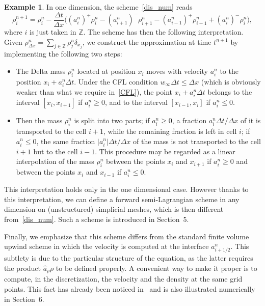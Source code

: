 \documentclass[11pt]{article}
\theoremstyle{definition}
\newtheorem{exam}[theo]{Example}
\numberwithin{equation}{section}
\newcommand*\ZZ{\mathbb{Z}}
\newcommand*\achapo{\widehat{a}}
\begin{document}
\begin{exam}\label{ex1D}
In one dimension, the scheme~\eqref{dis_num} reads
\[
\rho_{i}^{n+1} = \rho_i^n - \frac{\Delta t}{\Delta x}\Big((a_i^n)^+ \rho_i^n - (a_{i+1}^n)^- \rho_{i+1}^n - (a_{i-1}^n)^+ \rho_{i-1}^n + (a_i^n)^-\rho_i^n\Big),
\]
where $i$ is just taken in $\ZZ$. The scheme has then the following interpretation. Given $\rho^n_{\Delta x} = \sum_{j\in \ZZ} \rho_j^n \delta_{x_j}$, we construct the approximation at time $t^{n+1}$ by implementing the following two steps:
\begin{itemize}
\item The Delta mass $\rho_i^n$ located at position $x_i$ moves with velocity $a_i^n$ to the position $x_i+a_i^n \Delta t$. Under the CFL condition $w_\infty \Delta t \leq \Delta x$ (which is obviously weaker than what we require in~\eqref{CFL}), the point $x_i+a_i^n\Delta t$ belongs to the interval $[x_i,x_{i+1}]$ if $a_i^n\geq 0$, and to the interval $[x_{i-1},x_{i}]$ if $a_i^n\leq 0$.
\item Then the mass $\rho_{i}^n$ is split into two parts; if $a_{i}^n \geq 0$, a fraction $a_{i}^n \Delta t/\Delta x$ of it is transported to the cell $i+1$, while the remaining fraction is left in cell $i$; if $a_{i}^n \leq 0$, the same fraction $\vert a_{i}^n \vert \Delta t/\Delta x$ of the mass is not transported to the cell $i+1$ but to the cell $i-1$. This procedure may be regarded as a linear interpolation of the mass $\rho_{i}^n$ between the points $x_{i}$ and $x_{i+1}$ if $a_{i}^n \geq 0$ and between the points $x_{i}$ and $x_{i-1}$ if $a_{i}^n \leq 0$.
\end{itemize}
This interpretation holds only in the one dimensional case. However thanks to this interpretation, we can define a forward semi-Lagrangian scheme in any dimension on (unstructured) simplicial meshes, which is then different from~\eqref{dis_num}. Such a scheme is introduced in Section~5.

Finally, we emphasize that this scheme differs from the standard finite volume upwind scheme in which the velocity is computed at the interface $a_{i+1/2}^n$. This subtlety is due to the particular structure of the equation, as the latter requires the product $\achapo_{\rho} \rho$ to be defined properly. A convenient way to make it proper is to compute, in the discretization, the velocity and the density at the same grid points. This fact has already been noticed in~\cite{sinum,sisc} and is also illustrated numerically in Section~6.
\end{exam}
\end{document}
